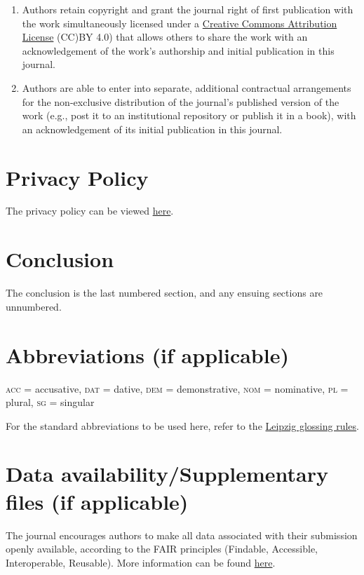 \documentclass[charis,linguex]{glossa}
\begin{document}
\begin{enumerate}[label=\arabic*.]
\item Authors retain copyright and grant the journal right of first publication with the work simultaneously licensed under a \href{https://creativecommons.org/licenses/by/4.0/}{Creative Commons Attribution License} (CC)BY 4.0) that allows others to share the work with an acknowledgement of the work's authorship and initial publication in this journal. 
\item Authors are able to enter into separate, additional contractual arrangements for the non-exclusive distribution of the journal's published version of the work (e.g., post it to an institutional repository or publish it in a book), with an acknowledgement of its initial publication in this journal.
\end{enumerate}



\section{Privacy Policy}

The privacy policy can be viewed \href{https://www.openlibhums.org/site/privacy/}{here}.


\section{Conclusion}

The conclusion is the last numbered section, and any ensuing sections are unnumbered.

\section*{Abbreviations (if applicable)}\label{abbrev}

\textsc{acc} = accusative, \textsc{dat} = dative, \textsc{dem} = demonstrative, \textsc{nom} = nominative, \textsc{pl} = plural, \textsc{sg} = singular

For the standard abbreviations to be used here, refer to the \href{https://www.eva.mpg.de/lingua/resources/glossing-rules.php}{Leipzig glossing rules}.

\section*{Data availability/Supplementary files (if applicable)}

The journal encourages authors to make all data associated with their submission openly available, according to the FAIR principles (Findable, Accessible, Interoperable, Reusable). More information can be found \href{https://www.glossa-journal.org/site/editorial-policies/#data-policy}{here}.
\end{document}
